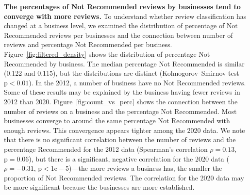\textbf{The percentages of Not Recommended reviews by businesses tend to converge with more reviews.} To understand whether review classification has changed at a business level, we examined the distribution of percentage of Not Recommended reviews per businesses and the connection between number of reviews and percentage Not Recommended per business. Figure~\ref{fig:filtered_density} shows the distribution of percentage Not Recommended by business. The median percentage Not Recommended is similar (0.122 and 0.115), but the distributions are distinct (Kolmogorov–Smirnov test $\text{p}<0.01$). In the 2012, a number of business have no Not Recommended reviews. Some of these results may be explained by the business having fewer reviews in 2012 than 2020. Figure~\ref{fig:count_vs_perc} shows the connection between the number of reviews on a business and the percentage Not Recommended. Most businesses converge to around the same percentage Not Recommended with enough reviews. This convergence appears tighter among the 2020 data. We note that there is no significant correlation between the number of reviews and the percentage Recommended for the 2012 data (Spearman's correlation $\rho = 0.13$, $\text{p} = 0.06$), but there is a significant, negative correlation for the 2020 data ($\rho = -0.31$, $\text{p}<1\text{e}-5$)---the more reviews a business has, the smaller the proportion of Not Recommended reviews. The correlation for the 2020 data may be more significant because the businesses are more established.


